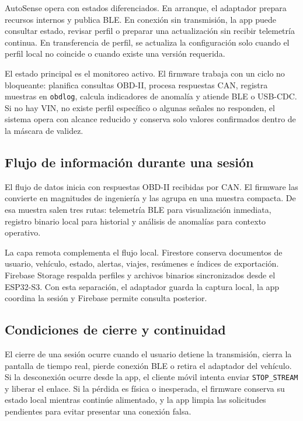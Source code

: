 \documentclass[12pt,letterpaper]{report}
\begin{document}
AutoSense opera con estados diferenciados. En arranque, el adaptador prepara recursos internos y publica BLE. En conexión sin transmisión, la app puede consultar estado, revisar perfil o preparar una actualización sin recibir telemetría continua. En transferencia de perfil, se actualiza la configuración solo cuando el perfil local no coincide o cuando existe una versión requerida.

El estado principal es el monitoreo activo. El firmware trabaja con un ciclo no bloqueante: planifica consultas OBD-II, procesa respuestas CAN, registra muestras en \texttt{obdlog}, calcula indicadores de anomalía y atiende BLE o USB-CDC. Si no hay VIN, no existe perfil específico o algunas señales no responden, el sistema opera con alcance reducido y conserva solo valores confirmados dentro de la máscara de validez.

\subsection{Flujo de información durante una sesión}

El flujo de datos inicia con respuestas OBD-II recibidas por CAN. El firmware las convierte en magnitudes de ingeniería y las agrupa en una muestra compacta. De esa muestra salen tres rutas: telemetría BLE para visualización inmediata, registro binario local para historial y análisis de anomalías para contexto operativo.

La capa remota complementa el flujo local. Firestore conserva documentos de usuario, vehículo, estado, alertas, viajes, resúmenes e índices de exportación. Firebase Storage respalda perfiles y archivos binarios sincronizados desde el ESP32-S3. Con esta separación, el adaptador guarda la captura local, la app coordina la sesión y Firebase permite consulta posterior.

\subsection{Condiciones de cierre y continuidad}

El cierre de una sesión ocurre cuando el usuario detiene la transmisión, cierra la pantalla de tiempo real, pierde conexión BLE o retira el adaptador del vehículo. Si la desconexión ocurre desde la app, el cliente móvil intenta enviar \texttt{STOP\_STREAM} y liberar el enlace. Si la pérdida es física o inesperada, el firmware conserva su estado local mientras continúe alimentado, y la app limpia las solicitudes pendientes para evitar presentar una conexión falsa.
\end{document}
